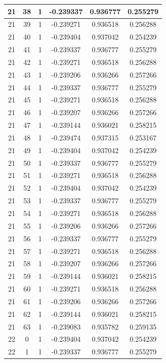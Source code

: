 \documentclass[12pt,a4paper]{article}
\numberwithin{equation}{section}
\numberwithin{figure}{section}
\numberwithin{table}{section}
\begin{document}
\begin{longtable}{|c|c|c|c|c|c|}
21 & 38 & 1 & -0.239337 & 0.936777 & 0.255279 \\ \hline
21 & 39 & 1 & -0.239271 & 0.936518 & 0.256288 \\ \hline
21 & 40 & 1 & -0.239404 & 0.937042 & 0.254239 \\ \hline
21 & 41 & 1 & -0.239337 & 0.936777 & 0.255279 \\ \hline
21 & 42 & 1 & -0.239271 & 0.936518 & 0.256288 \\ \hline
21 & 43 & 1 & -0.239206 & 0.936266 & 0.257266 \\ \hline
21 & 44 & 1 & -0.239337 & 0.936777 & 0.255279 \\ \hline
21 & 45 & 1 & -0.239271 & 0.936518 & 0.256288 \\ \hline
21 & 46 & 1 & -0.239207 & 0.936266 & 0.257266 \\ \hline
21 & 47 & 1 & -0.239144 & 0.936021 & 0.258215 \\ \hline
21 & 48 & 1 & -0.239474 & 0.937315 & 0.253167 \\ \hline
21 & 49 & 1 & -0.239404 & 0.937042 & 0.254239 \\ \hline
21 & 50 & 1 & -0.239337 & 0.936777 & 0.255279 \\ \hline
21 & 51 & 1 & -0.239271 & 0.936518 & 0.256288 \\ \hline
21 & 52 & 1 & -0.239404 & 0.937042 & 0.254239 \\ \hline
21 & 53 & 1 & -0.239337 & 0.936777 & 0.255279 \\ \hline
21 & 54 & 1 & -0.239271 & 0.936518 & 0.256288 \\ \hline
21 & 55 & 1 & -0.239206 & 0.936266 & 0.257266 \\ \hline
21 & 56 & 1 & -0.239337 & 0.936777 & 0.255279 \\ \hline
21 & 57 & 1 & -0.239271 & 0.936518 & 0.256288 \\ \hline
21 & 58 & 1 & -0.239207 & 0.936266 & 0.257266 \\ \hline
21 & 59 & 1 & -0.239144 & 0.936021 & 0.258215 \\ \hline
21 & 60 & 1 & -0.239271 & 0.936518 & 0.256288 \\ \hline
21 & 61 & 1 & -0.239206 & 0.936266 & 0.257266 \\ \hline
21 & 62 & 1 & -0.239144 & 0.936021 & 0.258215 \\ \hline
21 & 63 & 1 & -0.239083 & 0.935782 & 0.259135 \\ \hline
22 & 0 & 1 & -0.239404 & 0.937042 & 0.254239 \\ \hline
22 & 1 & 1 & -0.239337 & 0.936777 & 0.255279 \\ \hline

\end{longtable}
\end{document}
